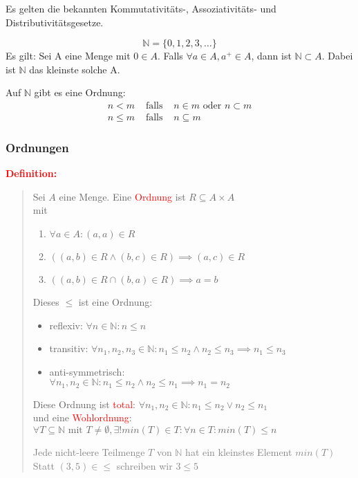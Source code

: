 \documentclass{article}
\newcommand{\red}[1]{\textcolor{red}{#1}}
\newcommand{\gray}[1]{\textcolor{gray}{#1}}
\newcommand{\de}[1]{\red{\textbf{Definition: }}\begin{quote}#1\end{quote}}
\newcommand{\N}{\mathbb{N}}
\begin{document}
Es gelten die bekannten Kommutativitäts-, Assoziativitäts- und \\Distributivitätsgesetze.

\[
    \N = \{0, 1, 2, 3, \dots\}
\]
Es gilt: Sei A eine Menge mit $0 \in A$. Falls $\forall a \in A, a^+ \in A$, dann ist $\N \subset A$. Dabei ist $\N$ das kleinste solche A.

Auf $\N$ gibt es eine Ordnung:
\[
    \begin{array}{lcl}
        n < m &\text{ falls }& n \in m \text{ oder } n \subset m\\
        n \leq m &\text{ falls }& n \subseteq m
    \end{array}
\]

\subsubsection{Ordnungen}

\de{
    Sei $A$ eine Menge. Eine \red{Ordnung} ist $R \subseteq A \times A$\\
    mit\begin{enumerate}
        \item $\forall a \in A: (a, a) \in R$
        \item $((a, b) \in R \land (b, c) \in R) \implies (a, c) \in R$
        \item $((a,b) \in R \cap (b, a) \in R) \implies a = b$
    \end{enumerate}
    Dieses $\leq$ ist eine Ordnung:
    \begin{itemize}
        \item reflexiv: $\forall n \in \N: n \leq n$
        \item transitiv: $\forall n_1, n_2, n_3 \in \N: n_1 \leq n_2 \land n_2 \leq n_3 \implies n_1 \leq n_3$
        \item anti-symmetrisch:\\$\forall n_1, n_2 \in \N: n_1 \leq n_2 \land n_2 \leq n_1 \implies n_1 = n_2$
    \end{itemize}
    Diese Ordnung ist \red{total}: $\forall n_1, n_2 \in \N: n_1 \leq n_2 \lor n_2 \leq n_1$\\
    und eine \red{Wohlordnung}:\\ $\forall T \subseteq \N \text{ mit } T \neq \emptyset, \exists! min(T) \in T: \forall n \in T: min(T) \leq n$

    \gray{
        Jede nicht-leere Teilmenge $T$ von $\N$ hat ein kleinstes Element $min(T)$\\
        Statt $(3,5) \in \leq$ schreiben wir $3 \leq 5$
    }
}
\end{document}
